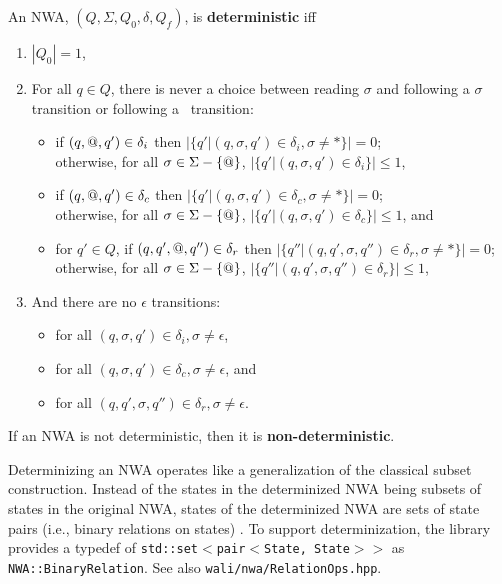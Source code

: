 \begin{definition}
An NWA, $(Q,\Sigma,Q_0,\delta,Q_f)$, is \textbf{deterministic} iff 

\begin{enumerate} 

\item $|Q_0| = 1$, 

\item For all $q \in Q$, there is never a choice between reading $\sigma$ and
  following a $\sigma$ transition or following a \wild\ transition:
  \begin{itemize}
    \item if $(q,@,q') \in \delta_i$ then $|\{q'|(q,\sigma,q') \in
      \delta_i, {\sigma\neq*}\}| = 0$; \\ otherwise, for all $\sigma \in \Sigma - \{@\}$,
      $|\{q'|(q,\sigma,q') \in \delta_i\}| \leq 1$,

    \item if $(q,@,q') \in \delta_c$ then $ |\{q'|(q,\sigma,q') \in
      \delta_c, {\sigma\neq*}\}| = 0$;\\
      otherwise, for all $\sigma \in \Sigma - \{@\}$,
      $|\{q'|(q,\sigma,q') \in \delta_c\}| \leq 1$, and

    \item for $q' \in Q$, if $(q,q',@,q'') \in \delta_r$ then
      $|\{q''|(q,q',\sigma,q'') \in \delta_r, {\sigma\neq*}\}| = 0$; \\
      otherwise, for all
      $\sigma \in \Sigma - \{@\}$, $|\{q''|(q,q',\sigma,q'') \in \delta_r\}|
      \leq 1$,
  \end{itemize}
\item And there are no $\epsilon$ transitions:
 \begin{itemize}
   \item for all $(q,\sigma,q') \in \delta_i, \sigma \neq \epsilon$,
   \item for all $(q,\sigma,q') \in \delta_c, \sigma \neq \epsilon$, and
   \item for all $(q,q',\sigma,q'') \in \delta_r, \sigma \neq \epsilon$.
 \end{itemize}
\end{enumerate}
If an NWA is not deterministic, then it is \textbf{non-deterministic}.
\end{definition}

Determinizing an NWA operates like a
generalization of the classical subset construction.  Instead of the states
in the determinized NWA being subsets of states in the original NWA, states of the
determinized NWA are sets of state pairs (i.e., binary relations on states)
\cite{JACM:AM2009}.  To support determinization, the library provides a
typedef of \texttt{std::set$<$pair$<$State, State$>>$} as 
\texttt{NWA::BinaryRelation}. See also \texttt{wali/nwa/RelationOps.hpp}.

